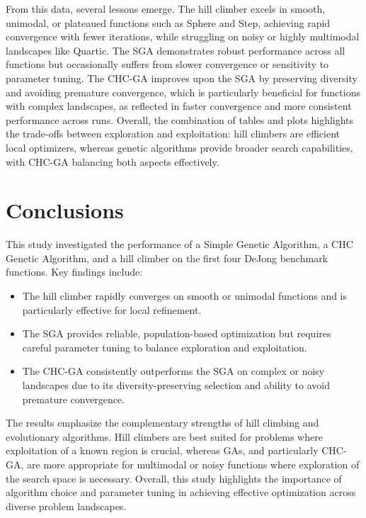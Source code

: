 \documentclass[11pt]{article}
\begin{document}
From this data, several lessons emerge. The hill climber excels in smooth, unimodal, or plateaued functions such as Sphere and Step, achieving rapid convergence with fewer iterations, while struggling on noisy or highly multimodal landscapes like Quartic. The SGA demonstrates robust performance across all functions but occasionally suffers from slower convergence or sensitivity to parameter tuning. The CHC-GA improves upon the SGA by preserving diversity and avoiding premature convergence, which is particularly beneficial for functions with complex landscapes, as reflected in faster convergence and more consistent performance across runs. Overall, the combination of tables and plots highlights the trade-offs between exploration and exploitation: hill climbers are efficient local optimizers, whereas genetic algorithms provide broader search capabilities, with CHC-GA balancing both aspects effectively.

\section{Conclusions}
\label{section-conclusion}

This study investigated the performance of a Simple Genetic Algorithm, a CHC Genetic Algorithm, and a hill climber on the first four DeJong benchmark functions. Key findings include:

\begin{itemize}
    \item The hill climber rapidly converges on smooth or unimodal functions and is particularly effective for local refinement.
    \item The SGA provides reliable, population-based optimization but requires careful parameter tuning to balance exploration and exploitation.
    \item The CHC-GA consistently outperforms the SGA on complex or noisy landscapes due to its diversity-preserving selection and ability to avoid premature convergence.
\end{itemize}

The results emphasize the complementary strengths of hill climbing and evolutionary algorithms. Hill climbers are best suited for problems where exploitation of a known region is crucial, whereas GAs, and particularly CHC-GA, are more appropriate for multimodal or noisy functions where exploration of the search space is necessary. Overall, this study highlights the importance of algorithm choice and parameter tuning in achieving effective optimization across diverse problem landscapes.
\end{document}
